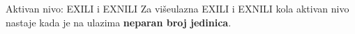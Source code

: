 \begin{frame}[label=01-s032]{Aktivan nivo: EXILI i EXNILI}
Za višeulazna EXILI i EXNILI kola aktivan nivo nastaje kada je na ulazima \textbf{neparan broj jedinica}.
\centering\par
\end{frame}
